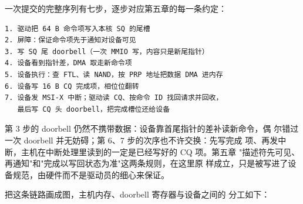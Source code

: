 一次提交的完整序列有七步，逐步对应第五章的每一条约定：

\begin{lstlisting}
1. 驱动把 64 B 命令项写入本核 SQ 的尾槽
2. 屏障：保证命令项先于通知对设备可见
3. 写 SQ 尾 doorbell（一次 MMIO 写，内容只是新尾指针）
4. 设备看到指针差，DMA 取走新命令项
5. 设备执行：查 FTL、读 NAND，按 PRP 地址把数据 DMA 进内存
6. 设备写 16 B CQ 完成项，相位位翻转
7. 设备发 MSI-X 中断；驱动读 CQ、按命令 ID 找回请求并回收，
   最后写 CQ 头 doorbell，把完成槽位还给设备
\end{lstlisting}

第 3 步的 doorbell 仍然不携带数据：设备靠首尾指针的差补读新命令，偶
尔错过一次 doorbell 并无妨碍；第 6、7 步的次序也不许交换：先写完成
项、再发中断，主机在中断处理里读到的一定是已经写好的 CQ 项。第五章
"描述符先可见、再通知"和"完成以写回状态为准"这两条规则，在这里原
样成立，只是被写进了设备规范，由硬件而不是驱动员的细心来保证。

把这条链路画成图，主机内存、doorbell 寄存器与设备之间的
分工如下：

